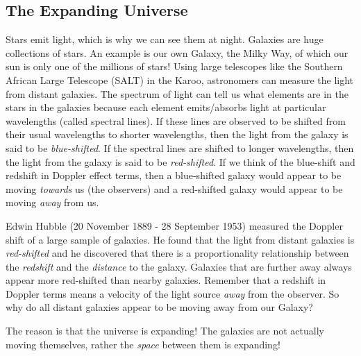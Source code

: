 \subsection{The Expanding Universe}
Stars emit light, which is why we can see them at night. Galaxies are huge collections of stars. An example is our own Galaxy, the Milky Way, of which our sun is only one of the millions of stars! Using large telescopes like the Southern African Large Telescope (SALT) in the Karoo, astronomers can measure the light from distant galaxies. The spectrum of light can tell us what elements are in the stars in the galaxies because each element emits/absorbs light at particular wavelengths (called spectral lines). If these lines are observed to be shifted from their usual wavelengths to shorter wavelengths, then the light from the galaxy is said to be \textit{blue-shifted}. If the spectral lines are shifted to longer wavelengths, then the light from the galaxy is said to be \textit{red-shifted}. 
If we think of the blue-shift and redshift in Doppler effect terms, then a blue-shifted galaxy would appear to be moving \textit{towards} us (the observers) and a red-shifted galaxy would appear to be moving \textit{away} from us.



Edwin Hubble (20 November 1889 - 28 September 1953) measured the Doppler shift of a large sample of galaxies. He found that the light from distant galaxies is \textit{red-shifted} and he discovered that there is a proportionality relationship between the \textit{redshift} and the \textit{distance} to the galaxy. Galaxies that are further away always appear more red-shifted than nearby galaxies. Remember that a redshift in Doppler terms means a velocity of the light source \textit{away} from the observer. So why do all distant galaxies appear to be moving away from our Galaxy?

The reason is that the universe is expanding! The galaxies are not actually moving themselves, rather the \textit{space} between them is expanding!


